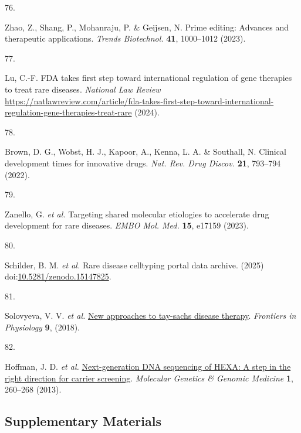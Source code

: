 \documentclass[
]{article}
\newlength{\cslhangindent}
\newlength{\csllabelwidth}
\newenvironment{CSLReferences}[2] %
 {\begin{list}{}{%
  \setlength{\itemindent}{0pt}
  \setlength{\leftmargin}{0pt}
  \setlength{\parsep}{0pt}
  \ifodd #1
   \setlength{\leftmargin}{\cslhangindent}
   \setlength{\itemindent}{-1\cslhangindent}
  \fi
  \setlength{\itemsep}{#2\baselineskip}}}
 {\end{list}}
\newcommand{\CSLLeftMargin}[1]{\parbox[t]{\csllabelwidth}{\strut#1\strut}}
\newcommand{\CSLRightInline}[1]{\parbox[t]{\linewidth - \csllabelwidth}{\strut#1\strut}}
\begin{document}
\begin{CSLReferences}{0}{0}
\CSLLeftMargin{76. }%
\CSLRightInline{Zhao, Z., Shang, P., Mohanraju, P. \& Geijsen, N. Prime
editing: Advances and therapeutic applications. \emph{Trends
Biotechnol.} \textbf{41}, 1000--1012 (2023).}

\CSLLeftMargin{77. }%
\CSLRightInline{Lu, C.-F. {FDA} takes first step toward international
regulation of gene therapies to treat rare diseases. \emph{National Law
Review}
\url{https://natlawreview.com/article/fda-takes-first-step-toward-international-regulation-gene-therapies-treat-rare}
(2024).}

\CSLLeftMargin{78. }%
\CSLRightInline{Brown, D. G., Wobst, H. J., Kapoor, A., Kenna, L. A. \&
Southall, N. Clinical development times for innovative drugs. \emph{Nat.
Rev. Drug Discov.} \textbf{21}, 793--794 (2022).}

\CSLLeftMargin{79. }%
\CSLRightInline{Zanello, G. \emph{et al.} Targeting shared molecular
etiologies to accelerate drug development for rare diseases. \emph{EMBO
Mol. Med.} \textbf{15}, e17159 (2023).}

\CSLLeftMargin{80. }%
\CSLRightInline{Schilder, B. M. \emph{et al.} Rare disease celltyping
portal data archive. (2025)
doi:\href{https://doi.org/10.5281/zenodo.15147825}{10.5281/zenodo.15147825}.}

\CSLLeftMargin{81. }%
\CSLRightInline{Solovyeva, V. V. \emph{et al.}
\href{https://doi.org/10.3389/fphys.2018.01663}{New approaches to
tay-sachs disease therapy}. \emph{Frontiers in Physiology} \textbf{9},
(2018).}

\CSLLeftMargin{82. }%
\CSLRightInline{Hoffman, J. D. \emph{et al.}
\href{https://doi.org/10.1002/mgg3.37}{Next-generation DNA sequencing of
HEXA: A step in the right direction for carrier screening}.
\emph{Molecular Genetics \& Genomic Medicine} \textbf{1}, 260--268
(2013).}

\end{CSLReferences}

\hfill\break

\newpage

\renewcommand\thefigure{S\arabic{figure}}    
\renewcommand\thetable{S\arabic{table}}

\subsection{Supplementary Materials}\label{supplementary-materials}
\end{document}

